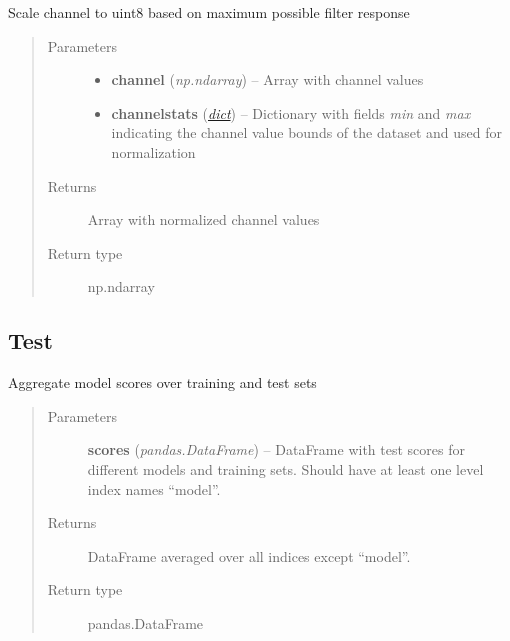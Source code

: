 \documentclass[letterpaper,10pt,english]{sphinxmanual}
\begin{document}
\begin{fulllineitems}
\label{classification:flamingo.classification.channels.normalize_channel}
Scale channel to uint8 based on maximum possible filter response
\begin{quote}\begin{description}
\item[{Parameters}] \leavevmode\begin{itemize}
\item {} 
\textbf{channel} (\emph{np.ndarray}) -- Array with channel values

\item {} 
\textbf{channelstats} (\href{http://docs.python.org/library/stdtypes.html\#dict}{\emph{dict}}) -- Dictionary with fields \emph{min} and \emph{max} indicating the channel
value bounds of the dataset and used for normalization

\end{itemize}

\item[{Returns}] \leavevmode
Array with normalized channel values

\item[{Return type}] \leavevmode
np.ndarray

\end{description}\end{quote}

\end{fulllineitems}



\subsection{Test}
\label{classification:test}\label{classification:module-flamingo.classification.test}

\begin{fulllineitems}
\label{classification:flamingo.classification.test.aggregate_scores}
Aggregate model scores over training and test sets
\begin{quote}\begin{description}
\item[{Parameters}] \leavevmode
\textbf{scores} (\emph{pandas.DataFrame}) -- DataFrame with test scores for different models and training sets.
Should have at least one level index names ``model''.

\item[{Returns}] \leavevmode
DataFrame averaged over all indices except ``model''.

\item[{Return type}] \leavevmode
pandas.DataFrame

\end{description}\end{quote}

\end{fulllineitems}
\end{document}
